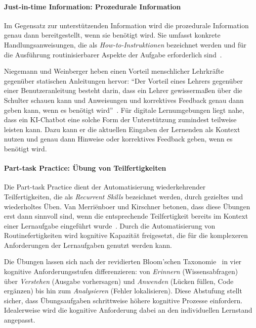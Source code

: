 \paragraph{Just-in-time Information: Prozedurale Information}

Im Gegensatz zur unterstützenden Information wird die prozedurale Information genau dann bereitgestellt, wenn sie benötigt wird. Sie umfasst konkrete Handlungsanweisungen, die als \textit{How-to-Instruktionen} bezeichnet werden und für die Ausführung routinisierbarer Aspekte der Aufgabe erforderlich sind~\cite{niegemann2020}.

Niegemann und Weinberger heben einen Vorteil menschlicher Lehrkräfte gegenüber statischen Anleitungen hervor: \enquote{Der Vorteil eines Lehrers gegenüber einer Benutzeranleitung besteht darin, dass ein Lehrer gewissermaßen über die Schulter schauen kann und Anweisungen und korrektives Feedback genau dann geben kann, wenn es benötigt wird}~\cite{niegemann2020}. Für digitale Lernumgebungen liegt nahe, dass ein KI-Chatbot eine solche Form der Unterstützung zumindest teilweise leisten kann. Dazu kann er die aktuellen Eingaben der Lernenden als Kontext nutzen und genau dann Hinweise oder korrektives Feedback geben, wenn es benötigt wird.

\paragraph{Part-task Practice: Übung von Teilfertigkeiten}

Die Part-task Practice dient der Automatisierung wiederkehrender Teilfertigkeiten, die als \textit{Recurrent Skills} bezeichnet werden, durch gezieltes und wiederholtes Üben. Van Merriënboer und Kirschner betonen, dass diese Übungen erst dann sinnvoll sind, wenn die entsprechende Teilfertigkeit bereits im Kontext einer Lernaufgabe eingeführt wurde~\cite{vanmerrienboer2018}. Durch die Automatisierung von Routinefertigkeiten wird kognitive Kapazität freigesetzt, die für die komplexeren Anforderungen der Lernaufgaben genutzt werden kann.

Die Übungen lassen sich nach der revidierten Bloom'schen Taxonomie~\cite{anderson2001} in vier kognitive Anforderungsstufen differenzieren: von \textit{Erinnern} (Wissensabfragen) über \textit{Verstehen} (Ausgabe vorhersagen) und \textit{Anwenden} (Lücken füllen, Code ergänzen) bis hin zum \textit{Analysieren} (Fehler lokalisieren). Diese Abstufung stellt sicher, dass Übungsaufgaben schrittweise höhere kognitive Prozesse einfordern. Idealerweise wird die kognitive Anforderung dabei an den individuellen Lernstand angepasst.

